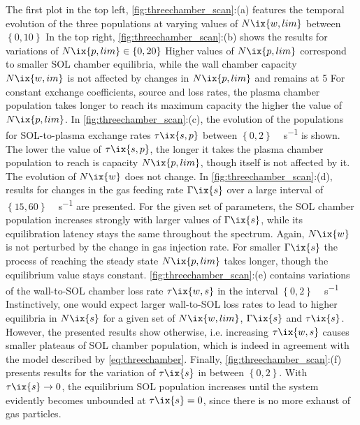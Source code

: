             The first plot in the top left, \cref{fig:threechamber_scan}:(a) features the temporal evolution of the three populations at varying values of $N\ix{w,lim}$ between $\left\{0, 10\right\}$\SI{}{\arbitraryunit} In the top right, \cref{fig:threechamber_scan}:(b) shows the results for variations of $N\ix{p,lim}\in\left\{0, 20\right\}$\SI{}{\arbitraryunit} Higher values of $N\ix{p,lim}$ correspond to smaller SOL chamber equilibria, while the wall chamber capacity $N\ix{w,im}$ is not affected by changes in $N\ix{p,lim}$ and remains at \SI{5}{\arbitraryunit} For constant exchange coefficients, source and loss rates, the plasma chamber population takes longer to reach its maximum capacity the higher the value of $N\ix{p,lim}$. In \cref{fig:threechamber_scan}:(c), the evolution of the populations for SOL-to-plasma exchange rates $\tau\ix{s,p}$ between $\left\{0, 2\right\}$\,\SI{}{\arbitraryunit\per\second} is shown. The lower the value of $\tau\ix{s,p}$, the longer it takes the plasma chamber population to reach is capacity $N\ix{p,lim}$, though itself is not affected by it. The evolution of $N\ix{w}$ does not change. In \cref{fig:threechamber_scan}:(d), results for changes in the gas feeding rate $\Gamma\ix{s}$ over a large interval of $\left\{15, 60\right\}$\,\SI{}{\arbitraryunit\per\second} are presented. For the given set of parameters, the SOL chamber population increases strongly with larger values of $\Gamma\ix{s}$, while its equilibration latency stays the same throughout the spectrum. Again, $N\ix{w}$ is not perturbed by the change in gas injection rate. For smaller $\Gamma\ix{s}$ the process of reaching the steady state $N\ix{p,lim}$ takes longer, though the equilibrium value stays constant. \autoref{fig:threechamber_scan}:(e) contains variations of the wall-to-SOL chamber loss rate $\tau\ix{w,s}$ in the interval $\left\{0, 2\right\}$\,\SI{}{\arbitraryunit\per\second} Instinctively, one would expect larger wall-to-SOL loss rates to lead to higher equilibria in $N\ix{s}$ for a given set of $N\ix{w,lim}$, $\Gamma\ix{s}$ and $\tau\ix{s}$. However, the presented results show otherwise, i.e. increasing $\tau\ix{w,s}$ causes smaller plateaus of SOL chamber population, which is indeed in agreement with the model described by \cref{eq:threechamber}. Finally, \cref{fig:threechamber_scan}:(f) presents results for the variation of $\tau\ix{s}$ in between $\left\{0, 2\right\}$. With $\tau\ix{s}\rightarrow0$, the equilibrium SOL population increases until the system evidently becomes unbounded at $\tau\ix{s}=0$, since there is no more exhaust of gas particles.\\%

